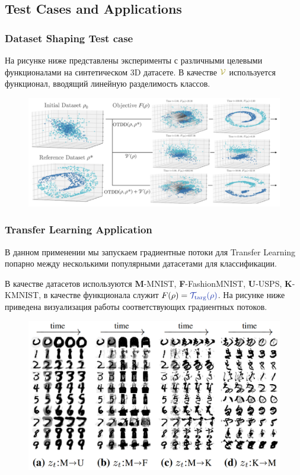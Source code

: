 \subsection{Test Cases and Applications}

\subsubsection{Dataset Shaping Test case}

На рисунке ниже представлены эксперименты  с различными целевыми функционалами на синтетическом 3D датасете. В качестве $\olive{\cV}$ используется функционал, вводящий линейную разделимость классов.

\begin{figure}[h]
    \centering
    \hspace*{-5mm}\includegraphics[width=0.9\linewidth]{chapters/petr_mokrov_s2/figs/dataset_shaping_final.png}
\end{figure}

\subsubsection{Transfer Learning Application}

В данном применении мы запускаем градиентные потоки для Transfer Learning попарно между несколькими популярными датасетами для классификации.

В качестве датасетов используются \textbf{M}-MNIST, \textbf{F}-FashionMNIST, \textbf{U}-USPS, \textbf{K}-KMNIST, в качестве функционала служит $F(\rho) = \twilight{\cT_{\targ}(\rho)}$. На рисунке ниже приведена визуализация работы соответствующих градиентных потоков.

\begin{figure}[h]
    \centering
    \includegraphics[width=0.7\linewidth]{chapters/petr_mokrov_s2/figs/dataset_dynamics_MKUF.png}
\end{figure}

